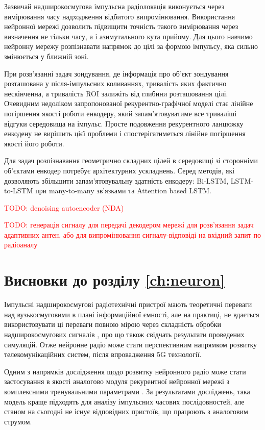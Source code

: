 Зазвичай надширокосмугова імпульсна радіолокація виконується 
через вимірювання часу надходження відбитого випромінювання. Використання 
нейронної мережі дозволить підвищити точність такого вимірювання через 
визначення не тільки часу, а і азимутального кута прийому. Для цього навчимо 
нейронну мережу розпізнавати напрямок до цілі за формою імпульсу, яка сильно 
змінюється у ближній зоні.

При розв'язанні задач зондування, де інформація про об'єкт зондування 
розташована у після-імпульсних коливаннях, тривалість яких фактично 
нескінченна, а тривалість ROI залижіть від глибини розташовання цілі. 
Очевидним недоліком запропонованої рекурентно-графічної моделі стає лінійне 
погіршення якості роботи енкодеру, який запам'ятовуватиме все триваліші
відгуки середовища на імпульс. Просте подовження рекурентного ланцюжку 
енкодену не вирішить цієї проблеми і спостерігатиметься лінійне погіршення 
якості його роботи.

Для задач розпізнавання геометрично складних цілей в середовищі зі сторонніми
об'єктами енкодер потребує архітектурних ускладнень. Серед методів, які 
дозволяють збільшити запам'ятовувальну здатність енкодеру: Bi-LSTM, 
LSTM-to-LSTM при many-to-many зв'язками та Attention based LSTM.

\textcolor{red}{TODO: denoising autoencoder (NDA)}

\textcolor{red}{TODO: генерація сигналу для передачі декодером мережі для 
розв'язання задач адаптивних антен, або для випромінювання сигналу-відповіді 
на вхідний запит по радіоаналу}

\section*{Висновки до розділу \ref{ch:neuron}}

Імпульсні надширокосмугові радіотехнічні пристрої мають теоретичні переваги 
над вузькосмуговими в плані інформаційної ємності, але на практиці, не 
вдається використовувати ці переваги повною мірою через складність обробки 
надширокосмугових сигналів \cite{imp:ChannelLimitations}, про що також 
свідчать результати проведених симуляцій. Отже нейронне радіо може стати 
перспективним напрямком розвитку телекомунікаційних систем, після 
впровадження 5G технології.

Одним з напрямків дослідження щодо розвитку нейронного радіо може стати
застосування в якості аналогово модуля рекурентної нейронної мережі з 
комплексними тренувальними параметрами \cite{imp:NIPS2018}. За результатами 
досліджень, така модель краще підходять для аналізу імпульсних часових 
послідовностей, але станом на сьогодні не існує відповідних пристоїв, що 
працюють з аналоговим струмом.

